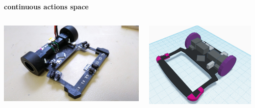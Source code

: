 \documentclass[xcolor=dvipsnames]{beamer}
\begin{document}
\begin{frame}{\bf continuous actions space}

  \begin{columns}[t]

    \begin{column}{0.5\textwidth}
      {\centering \includegraphics[scale=0.04]{../images/motoko_uprising.jpg}}
    \end{column}

    \begin{column}{0.5\textwidth}
      {\centering \includegraphics[scale=0.2]{../images/robot_model.png}}
    \end{column}


  \end{columns}

\end{frame}
\end{document}
